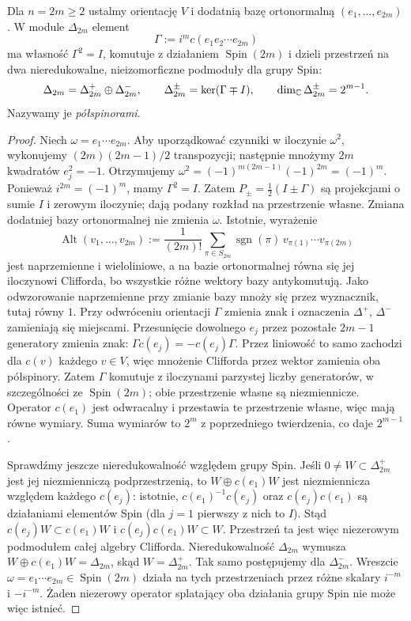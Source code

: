 \begin{stwierdzenie}
\label{prop:spin-chiral}
Dla $n=2m\geq2$ ustalmy orientację $V$ i dodatnią bazę
ortonormalną $(e_1,\ldots,e_{2m})$. W module $\Delta_{2m}$
element
\[
 \Gamma:=i^m c(e_1e_2\cdots e_{2m})
\]
ma własność $\Gamma^2=I$, komutuje z działaniem
$\operatorname{Spin}(2m)$ i dzieli przestrzeń
na dwa nieredukowalne, nieizomorficzne podmoduły dla grupy Spin:
\[
 \Delta_{2m}=\Delta^+_{2m}\oplus\Delta^-_{2m},
 \qquad
 \Delta^\pm_{2m}=\ker(\Gamma\mp I),\qquad
 \dim_{\mathbb{C}}\Delta^\pm_{2m}=2^{m-1}.
\]
Nazywamy je \emph{półspinorami}.
\end{stwierdzenie}
\begin{proof}
Niech $\omega=e_1\cdots e_{2m}$. Aby uporządkować czynniki
w iloczynie $\omega^2$, wykonujemy $(2m)(2m-1)/2$ transpozycji;
następnie mnożymy $2m$ kwadratów $e_j^2=-1$.
Otrzymujemy
$\omega^2=(-1)^{m(2m-1)}(-1)^{2m}=(-1)^m$.
Ponieważ $i^{2m}=(-1)^m$, mamy $\Gamma^2=I$.
Zatem $P_\pm=\tfrac12(I\pm\Gamma)$ są projekcjami
o sumie $I$ i zerowym iloczynie; dają podany rozkład na przestrzenie własne.
Zmiana dodatniej bazy ortonormalnej nie zmienia $\omega$.
Istotnie, wyrażenie
\[
 \operatorname{Alt}(v_1,\ldots,v_{2m})
 :=\frac{1}{(2m)!}
   \sum_{\pi\in S_{2m}}\operatorname{sgn}(\pi)\,
    v_{\pi(1)}\cdots v_{\pi(2m)}
\]
jest naprzemienne i wieloliniowe, a na bazie ortonormalnej
równa się jej iloczynowi Clifforda, bo wszystkie różne
wektory bazy antykomutują. Jako odwzorowanie naprzemienne
przy zmianie bazy mnoży się przez wyznacznik, tutaj równy $1$.
Przy odwróceniu orientacji $\Gamma$ zmienia znak i oznaczenia
$\Delta^+$, $\Delta^-$ zamieniają się miejscami.
Przesunięcie dowolnego $e_j$ przez pozostałe
$2m-1$ generatory zmienia znak:
$\Gamma c(e_j)=-c(e_j)\Gamma$.
Przez liniowość to samo zachodzi dla $c(v)$ każdego $v\in V$,
więc mnożenie Clifforda przez wektor zamienia oba półspinory.
Zatem $\Gamma$ komutuje z iloczynami
parzystej liczby generatorów, w szczególności
ze $\operatorname{Spin}(2m)$; obie przestrzenie
własne są niezmiennicze. Operator
$c(e_1)$ jest odwracalny i przestawia
te przestrzenie własne, więc mają równe
wymiary. Suma wymiarów to $2^m$ z poprzedniego
twierdzenia, co daje $2^{m-1}$.

Sprawdźmy jeszcze nieredukowalność względem grupy Spin.
Jeśli $0\ne W\subset\Delta^+_{2m}$ jest jej niezmienniczą
podprzestrzenią, to $W\oplus c(e_1)W$ jest niezmiennicza
względem każdego $c(e_j)$: istotnie,
$c(e_1)^{-1}c(e_j)$ oraz $c(e_j)c(e_1)$ są działaniami
elementów Spin (dla $j=1$ pierwszy z nich to $I$).
Stąd $c(e_j)W\subset c(e_1)W$ i
$c(e_j)c(e_1)W\subset W$.
Przestrzeń ta jest więc niezerowym podmodułem całej algebry
Clifforda. Nieredukowalność $\Delta_{2m}$ wymusza
$W\oplus c(e_1)W=\Delta_{2m}$, skąd $W=\Delta^+_{2m}$.
Tak samo postępujemy dla $\Delta^-_{2m}$.
Wreszcie $\omega=e_1\cdots e_{2m}\in\operatorname{Spin}(2m)$
działa na tych przestrzeniach przez różne skalary
$i^{-m}$ i $-i^{-m}$. Żaden niezerowy operator splatający
oba działania grupy Spin nie może więc istnieć.
\end{proof}

